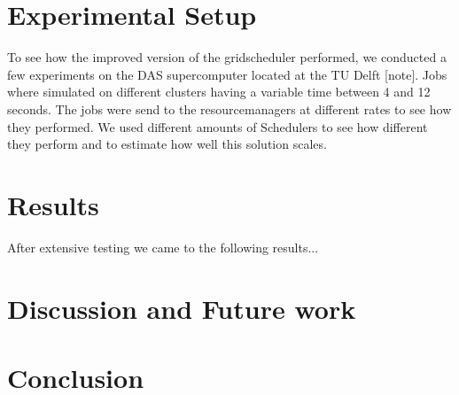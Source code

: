 \documentclass[twocolumn,a4paper]{article}
\begin{document}
\section{Experimental Setup}
To see how the improved version of the gridscheduler performed, we conducted a few experiments on the DAS supercomputer located at the TU Delft [note]. Jobs where simulated on different clusters having a variable time between 4 and 12 seconds. The jobs were send to the resourcemanagers at different rates to see how they performed. We used different amounts of Schedulers to see how different they perform and to estimate how well this solution scales.

\section{Results}
After extensive testing we came to the following results...

\section{Discussion and Future work}


\section{Conclusion}
\end{document}
